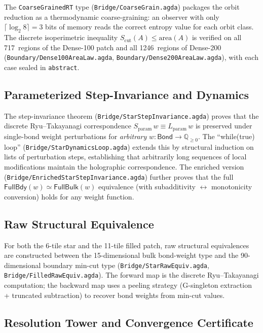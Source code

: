 \documentclass[11pt, a4paper]{article}
\theoremstyle{plain}
\theoremstyle{definition}
\newcommand{\RT}{Ryu--Takayanagi}
\newcommand{\Qgeq}{\mathbb{Q}_{\geq 0}}
\newcommand{\Scut}{S_{\mathrm{cut}}}
\begin{document}
The \texttt{CoarseGrainedRT} type
(\texttt{Bridge/CoarseGrain.agda}) packages the orbit reduction
as a thermodynamic coarse-graining: an observer with only
$\lceil \log_2 8 \rceil = 3$ bits of memory reads the correct
entropy value for each orbit class.  The discrete isoperimetric
inequality $\Scut(A) \leq \mathrm{area}(A)$ is verified on all
717~regions of the Dense-100 patch and all 1246~regions of
Dense-200 (\texttt{Boundary/Dense100AreaLaw.agda},
\texttt{Boundary/Dense200AreaLaw.agda}), with each case
sealed in \texttt{abstract}.

\subsection{Parameterized Step-Invariance and Dynamics}

The step-invariance theorem
(\texttt{Bridge/StarStepInvariance.agda}) proves that the discrete
\RT{} correspondence $S_{\mathrm{param}}\,w \equiv
L_{\mathrm{param}}\,w$ is preserved under single-bond weight
perturbations for \emph{arbitrary} $w : \mathsf{Bond} \to \Qgeq$.
The ``while(true) loop'' (\texttt{Bridge/StarDynamicsLoop.agda})
extends this by structural induction on lists of perturbation
steps, establishing that arbitrarily long sequences of local
modifications maintain the holographic correspondence.  The
enriched version
(\texttt{Bridge/EnrichedStarStepInvariance.agda}) further proves
that the full $\mathsf{FullBdy}(w) \simeq \mathsf{FullBulk}(w)$
equivalence (with subadditivity $\leftrightarrow$ monotonicity
conversion) holds for any weight function.

\subsection{Raw Structural Equivalence}

For both the 6-tile star and the 11-tile filled patch,
raw structural equivalences are constructed between the
15-dimensional bulk bond-weight type and the 90-dimensional
boundary min-cut type (\texttt{Bridge/StarRawEquiv.agda},
\texttt{Bridge/FilledRawEquiv.agda}).  The forward map is the
discrete \RT{} computation; the backward map uses a peeling
strategy (G-singleton extraction + truncated subtraction) to
recover bond weights from min-cut values.

\subsection{Resolution Tower and Convergence Certificate}
\end{document}
